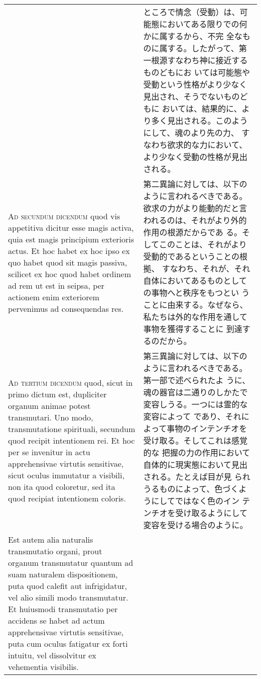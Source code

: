 \documentclass[10pt]{jsarticle} %
\begin{document}
\begin{longtable}{p{21em}p{21em}}
&

ところで情念（受動）は、可能態においてある限りでの何かに属するから、不完
 全なものに属する。したがって、第一根源すなわち神に接近するものどもにお
 いては可能態や受動という性格がより少なく見出され、そうでないものどもに
 おいては、結果的に、より多く見出される。このようにして、魂のより先の力、
 すなわち欲求的な力において、より少なく受動の性格が見出される。



\\



{\scshape Ad secundum dicendum} quod vis appetitiva dicitur esse magis activa, quia
 est magis principium exterioris actus. Et hoc habet ex hoc ipso ex quo
 habet quod sit magis passiva, scilicet ex hoc quod habet ordinem ad rem
 ut est in seipsa, per actionem enim exteriorem pervenimus ad
 consequendas res.


&

第二異論に対しては、以下のように言われるべきである。
欲求の力がより能動的だと言われるのは、それがより外的作用の根源だからであ
 る。そしてこのことは、それがより受動的であるということの根拠、
すなわち、それが、それ自体においてあるものとしての事物へと秩序をもつとい
 うことに由来する。なぜなら、私たちは外的な作用を通して事物を獲得することに
 到達するのだから。


\\



{\scshape Ad tertium dicendum} quod, sicut in primo dictum est, dupliciter organum
 animae potest transmutari. Uno modo, transmutatione spirituali,
 secundum quod recipit intentionem rei. Et hoc per se invenitur in actu
 apprehensivae virtutis sensitivae, sicut oculus immutatur a visibili,
 non ita quod coloretur, sed ita quod recipiat intentionem coloris. 


&

第三異論に対しては、以下のように言われるべきである。第一部で述べられたよ
 うに、魂の器官は二通りのしかたで変容しうる。一つには霊的な変容によって
 であり、それによって事物のインテンチオを受け取る。そしてこれは感覚的な
 把握の力の作用において自体的に現実態において見出される。たとえば目が見
 られうるものによって、色づくようにしてではなく色のイン
 テンチオを受け取るようにして変容を受ける場合のように。


\\

Est
 autem alia naturalis transmutatio organi, prout organum transmutatur
 quantum ad suam naturalem dispositionem, puta quod calefit aut
 infrigidatur, vel alio simili modo transmutatur. Et huiusmodi
 transmutatio per accidens se habet ad actum apprehensivae virtutis
 sensitivae, puta cum oculus fatigatur ex forti intuitu, vel dissolvitur
 ex vehementia visibilis. 



\end{longtable}
\end{document}
